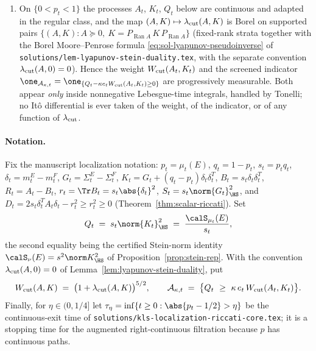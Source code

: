 \documentclass[../main.tex]{subfiles}
\begin{document}
\begin{enumerate}[label=(M\arabic*),leftmargin=3em]
  competitor family; hence the excess
  \[
    e_t \;=\; e_t(E)\;=\;P_t(E)-I_{\mu_t}(p_t)
  \]
  is progressively measurable.  This is a \emph{measurability} convention only: no
  supermartingale or martingale property of the moving profile infimum is asserted
  (the caveat of Lemma~\ref{lem:inf-martingales} is preserved), and no lower bound on
  $I_{\mu_t}(p_t)$ is used anywhere in this dossier.
  \item On $\{0<p_t<1\}$ the processes $A_t$, $K_t$, $Q_t$ below are continuous and adapted in
  the regular class, and the map $(A,K)\mapsto\lambda_{\rm cut}(A,K)$ is Borel on supported
  pairs $\{(A,K):A\succeq0,\ K=P_{\operatorname{Ran}A}\,K\,P_{\operatorname{Ran}A}\}$
  (fixed-rank strata together with the Borel Moore--Penrose formula
  \eqref{eq:sol-lyapunov-pseudoinverse} of
  \texttt{solutions/lem-lyapunov-stein-duality.tex}, with the separate convention
  $\lambda_{\rm cut}(A,0)=0$).  Hence the weight $W_{\rm cut}(A_t,K_t)$ and the screened
  indicator
  $\one_{\mathcal A_{\kappa,t}}=\one_{\{Q_t-\kappa e_tW_{\rm cut}(A_t,K_t)\ge0\}}$ are
  progressively measurable.  Both appear \emph{only} inside nonnegative Lebesgue-time
  integrals, handled by Tonelli; no It\^o differential is ever taken of the weight, of the
  indicator, or of any function of $\lambda_{\rm cut}$.
\end{enumerate}

\paragraph{Notation.}
Fix the manuscript localization notation: $p_t=\mu_t(E)$, $q_t=1-p_t$, $s_t=p_tq_t$,
$\delta_t=m_t^E-m_t^F$, $G_t=\Sigma_t^E-\Sigma_t^F$,
$K_t=G_t+(q_t-p_t)\delta_t\delta_t^T$,
$B_t=s_t\delta_t\delta_t^T$, $R_t=A_t-B_t$, $r_t=\Tr B_t=s_t\abs{\delta_t}^2$,
$S_t=s_t\norm{G_t}_\HS^2$, and $D_t=2s_t\delta_t^TA_t\delta_t-r_t^2\ge r_t^2\ge0$
(Theorem~\ref{thm:scalar-riccati}).  Set
\[
  Q_t\;=\;s_t\norm{K_t}_\HS^2\;=\;\frac{\calS_{\mu_t}(E)}{s_t},
\]
the second equality being the certified Stein-norm identity
$\calS_\nu(E)=s^2\norm K_\HS^2$ of Proposition~\ref{prop:stein-rep}.  With the convention
$\lambda_{\rm cut}(A,0)=0$ of Lemma~\ref{lem:lyapunov-stein-duality}, put
\[
  W_{\rm cut}(A,K)\;=\;\bigl(1+\lambda_{\rm cut}(A,K)\bigr)^{5/2},
  \qquad
  \mathcal A_{\kappa,t}\;=\;\bigl\{Q_t\ \ge\ \kappa\,e_t\,W_{\rm cut}(A_t,K_t)\bigr\}.
\]
Finally, for $\eta\in(0,1/4]$ let
$\tau_\eta=\inf\{t\ge0:\abs{p_t-1/2}>\eta\}$ be the continuous-exit time of
\texttt{solutions/kls-localization-riccati-core.tex}; it is a stopping time for the augmented
right-continuous filtration because $p$ has continuous paths.
\end{document}
